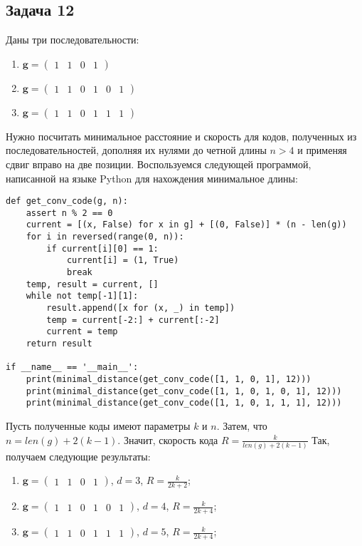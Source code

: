 \documentclass{article}
\begin{document}
\subsection{Задача 12}
Даны три последовательности:
\begin{enumerate}
    \item $\boldsymbol{g} = \begin{pmatrix}1 & 1 & 0 & 1\end{pmatrix}$
    \item $\boldsymbol{g} = \begin{pmatrix}1 & 1 & 0 & 1 & 0 & 1\end{pmatrix}$
    \item $\boldsymbol{g} = \begin{pmatrix}1 & 1 & 0 & 1 & 1 & 1\end{pmatrix}$
\end{enumerate}
%
Нужно посчитать минимальное расстояние и скорость для кодов, полученных из последовательностей, дополняя их нулями до четной длины $n > 4$ и применяя сдвиг вправо на две позиции.
Воспользуемся следующей программой, написанной на языке Python для нахождения минимальное длины:
%
\begin{lstlisting}[frame=single]
def get_conv_code(g, n):
    assert n % 2 == 0
    current = [(x, False) for x in g] + [(0, False)] * (n - len(g))
    for i in reversed(range(0, n)):
        if current[i][0] == 1:
            current[i] = (1, True)
            break
    temp, result = current, []
    while not temp[-1][1]:
        result.append([x for (x, _) in temp])
        temp = current[-2:] + current[:-2]
        current = temp
    return result

if __name__ == '__main__':
    print(minimal_distance(get_conv_code([1, 1, 0, 1], 12)))
    print(minimal_distance(get_conv_code([1, 1, 0, 1, 0, 1], 12)))
    print(minimal_distance(get_conv_code([1, 1, 0, 1, 1, 1], 12)))
\end{lstlisting}

Пусть полученные коды имеют параметры $k$ и $n$. Затем, что $n=len(g)+2(k-1)$. Значит, скорость кода $R=\frac{k}{len(g) + 2 (k - 1)}$
Так, получаем следующие результаты:
\begin{enumerate}
    \item $\boldsymbol{g} = \begin{pmatrix}1 & 1 & 0 & 1\end{pmatrix}$, $d=3$, $R=\frac{k}{2k + 2}$;
    \item $\boldsymbol{g} = \begin{pmatrix}1 & 1 & 0 & 1 & 0 & 1\end{pmatrix}$, $d=4$, $R=\frac{k}{2k + 4}$;
    \item $\boldsymbol{g} = \begin{pmatrix}1 & 1 & 0 & 1 & 1 & 1\end{pmatrix}$, $d=5$, $R=\frac{k}{2k + 4}$;
\end{enumerate}
%
\end{document}
